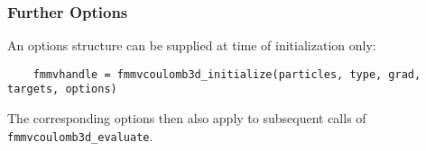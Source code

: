 \subsubsection*{Further Options}
An options structure can be supplied at time of initialization only:
\begin{verbatim}
    fmmvhandle = fmmvcoulomb3d_initialize(particles, type, grad, targets, options)
\end{verbatim}
The corresponding options then also apply to subsequent calls of 
\verb|fmmvcoulomb3d_evaluate|.

